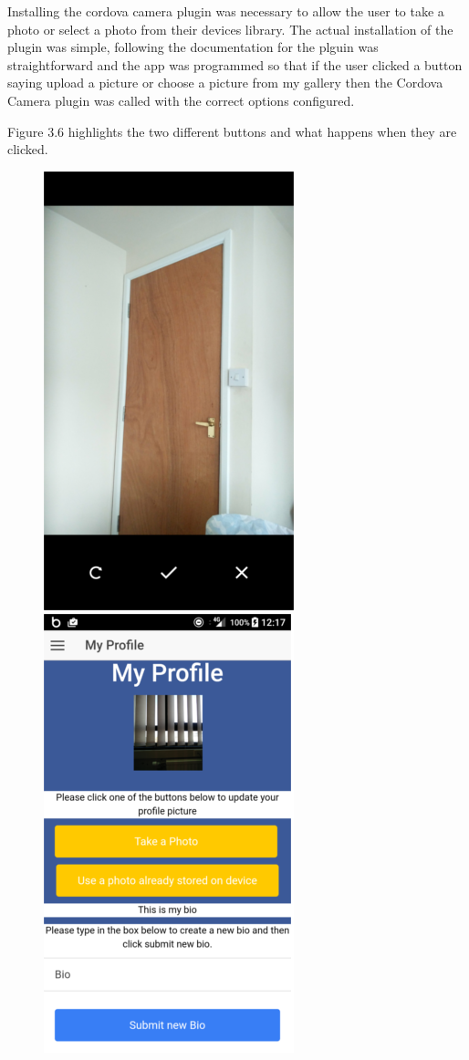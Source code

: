 Installing the cordova camera plugin \cite{cc} was necessary to allow the user to take a photo or select a photo from their devices library. The actual installation of the plugin was simple, following the documentation for the plguin was straightforward and the app was programmed so that if the user clicked a button saying upload a picture or choose a picture from my gallery then the Cordova Camera plugin was called with the correct options configured.

Figure 3.6 highlights the two different buttons and what happens when they are clicked.

\begin{figure}[H]
\includegraphics[scale=0.5]{images/cs}
\includegraphics[scale=0.5]{images/sc7}

\end{figure}
